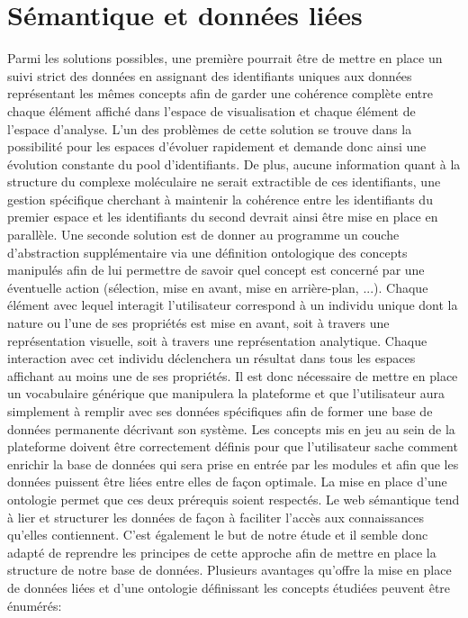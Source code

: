 

\section{Sémantique et données liées}

Parmi les solutions possibles, une première pourrait être de mettre en place un suivi strict des données en assignant des identifiants uniques aux données représentant les mêmes concepts afin de garder une cohérence complète entre chaque élément affiché dans l'espace de visualisation et chaque élément de l'espace d'analyse. L'un des problèmes de cette solution se trouve dans la possibilité pour les espaces d'évoluer rapidement et demande donc ainsi une évolution constante du pool d'identifiants. De plus, aucune information quant à la structure du complexe moléculaire ne serait extractible de ces identifiants, une gestion spécifique cherchant à maintenir la cohérence entre les identifiants du premier espace et les identifiants du second devrait ainsi être mise en place en parallèle.
Une seconde solution est de donner au programme un couche d'abstraction supplémentaire via une définition ontologique des concepts manipulés afin de lui permettre de savoir quel concept est concerné par une éventuelle action (sélection, mise en avant, mise en arrière-plan, ...). Chaque élément avec lequel interagit l'utilisateur correspond à un individu unique dont la nature ou l'une de ses propriétés est mise en avant, soit à travers une représentation visuelle, soit à travers une représentation analytique. Chaque interaction avec cet individu déclenchera un résultat dans tous les espaces affichant au moins une de ses propriétés.
Il est donc nécessaire de mettre en place un vocabulaire générique que manipulera la plateforme et que l'utilisateur aura simplement à remplir avec ses données spécifiques afin de former une base de données permanente décrivant son système. 
Les concepts mis en jeu au sein de la plateforme doivent être correctement définis pour que l'utilisateur sache comment enrichir la base de données qui sera prise en entrée par les modules et afin que les données puissent être liées entre elles de façon optimale. La mise en place d'une ontologie permet que ces deux prérequis soient respectés. Le web sémantique tend à lier et structurer les données de façon à faciliter l'accès aux connaissances qu'elles contiennent. C'est également le but de notre étude et il semble donc adapté de reprendre les principes de cette approche afin de mettre en place la structure de notre base de données. Plusieurs avantages qu'offre la mise en place de données liées et d'une ontologie définissant les concepts étudiées peuvent être énumérés:

